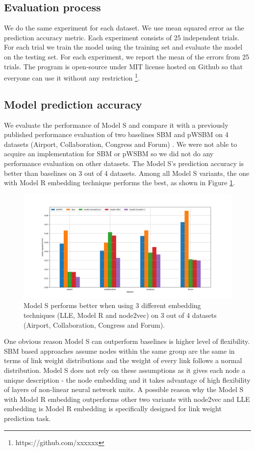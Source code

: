 \documentclass{article} %
\begin{document}
\subsection{Evaluation process}
We do the same experiment for each dataset.
We use mean squared error as the prediction accuracy metric.
Each experiment consists of 25 independent trials.
For each trial we train the model using the training set and evaluate the model on the testing set.
For each experiment, we report the mean of the errors from 25 trials.
The program is open-source under MIT license hosted on Github
so that everyone can use it without any restriction
\footnote{https://github.com/xxxxxx}.

\subsection{Model prediction accuracy}
We evaluate the performance of Model S and compare it with a previously published performance evaluation of two baselines SBM and pWSBM on 4 datasets (Airport, Collaboration, Congress and Forum) \citep{aicher2014learning}.
We were not able to acquire an implementation for SBM or pWSBM so we did not do any performance evaluation on other datasets.
The Model S's prediction accuracy is better than baselines on 3 out of 4 datasets.
Among all Model S variants,
the one with Model R embedding technique performs the best,
as shown in Figure \ref{fig:errors}.
\begin{figure}[h] \centering
	\includegraphics[width=1\linewidth]{weight-errors}
	\caption{
		Model S performs better when using 3 different embedding techniques (LLE, Model R and node2vec) on 3 out of 4 datasets (Airport, Collaboration, Congress and Forum).
	}
	\label{fig:errors}
\end{figure}
One obvious reason Model S can outperform baselines is higher level of flexibility.
SBM based approaches assume nodes within the same group are the same in terms of link weight distributions and the weight of every link follows a normal distribution.
Model S does not rely on these assumptions as it gives each node a unique description - the node embedding and it takes advantage of high flexibility of
layers of non-linear neural network units.
A possible reason why the Model S with Model R embedding outperforms other two variants with node2vec and LLE embedding is Model R embedding is specifically designed for link weight prediction task.
\end{document}
